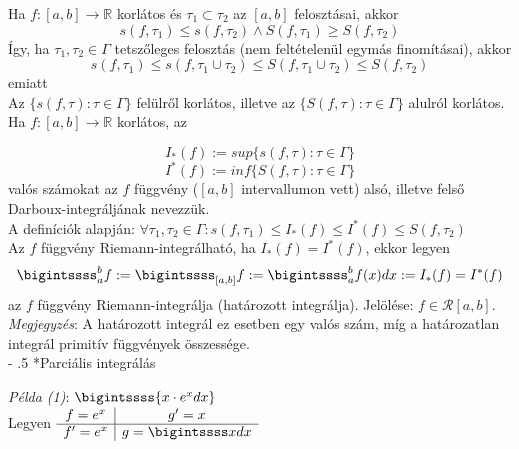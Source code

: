 \documentclass[12pt,margin=0px]{article}
\makeatletter
\renewcommand\paragraph{%
	\@startsection{paragraph}{4}{0mm}%
	{-\baselineskip}%
	{.5\baselineskip}%
	{\normalfont\normalsize\bfseries}}
\makeatother
\begin{document}
    \noindent Ha $f:[a,b] \to \mathbb{R}$ korlátos és $\tau_1 \subset \tau_2$ az $[a,b]$ felosztásai, akkor
    \[
        s(f, \tau_1) \leq s(f, \tau_2) \wedge S(f, \tau_1) \geq S(f, \tau_2)
    \]
    Így, ha $\tau_1, \tau_2 \in \Gamma$ tetszőleges felosztás (nem feltételenül egymás finomításai), akkor
    \[
        s(f, \tau_1) \leq s(f, \tau_1 \cup \tau_2) \leq S(f, \tau_1 \cup \tau_2) \leq S(f, \tau_2)
    \]
    emiatt\\
    					
	\noindent Az $ \Big\{ s(f, \tau): \tau \in \Gamma \Big\} $ felülről korlátos, illetve az $ \Big\{ S(f, \tau): \tau \in \Gamma \Big\} $ alulról korlátos.\\

    \noindent Ha $f:[a,b] \to \mathbb{R}$ korlátos, az

    \[
        I_*(f) := sup\Big\{ s(f, \tau) : \tau \in \Gamma \Big\}
    \]
    \[
        I^*(f) := inf\Big\{ S(f, \tau) : \tau \in \Gamma \Big\}
    \]
    valós számokat az $f$ függvény ($[a,b]$ intervallumon vett) alsó, illetve felső Darboux-integráljának nevezzük.\\
				
	\noindent A definíciók alapján: $\forall \tau_1, \tau_2 \in \Gamma : s(f, \tau_1) \leq I_*(f) \leq I^*(f) \leq S(f, \tau_2) $\\
				
    \noindent Az $ f $ függvény Riemann-integrálható, ha $ I_*(f) = I^*(f) $, ekkor legyen \\
    \[
        \bigintssss_{a}^{b}f := \bigintssss_{[a,b]}f := \bigintssss_{a}^{b}f(x) dx := I_*(f) = I^*(f)
    \]
    az $f$ függvény Riemann-integrálja (határozott integrálja). Jelölése: $ f \in \mathcal{R}[a,b].$\\

    \noindent \emph{Megjegyzés}: A határozott integrál ez esetben egy valós szám, míg a határozatlan integrál primitív függvények összessége.\\

    \paragraph*{Parciális integrálás}

    \noindent \emph{Példa (1)}: $\bigintssss{x \cdot e^x dx}$\\
    Legyen
    $\begin{array}{c|c}
        f = e^{x} & g' = x \\ \hline
        f' = e^{x} & g = \bigintssss x dx \\
    \end{array}$\\
\end{document}
